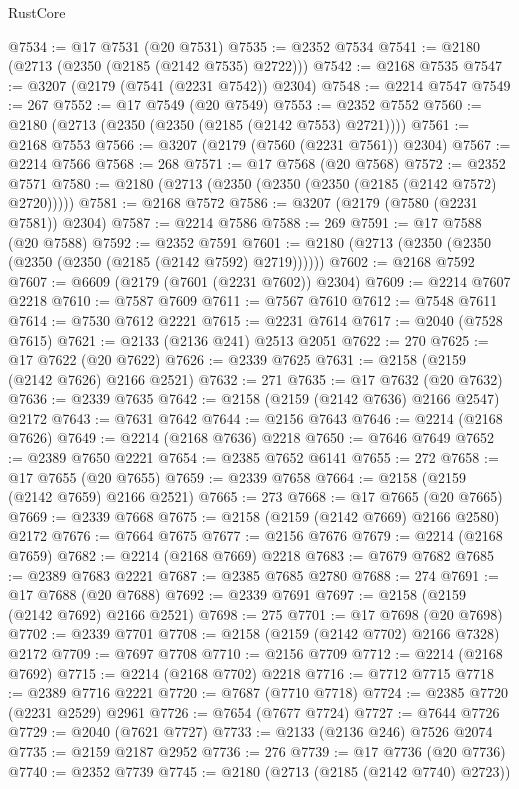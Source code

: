 \begin{lexlean}{RustCore}
\begin{coremodule}
@7534 := @17 @7531 (@20 @7531)
@7535 := @2352 @7534
@7541 := @2180 (@2713 (@2350 (@2185 (@2142 @7535) @2722)))
@7542 := @2168 @7535
@7547 := @3207 (@2179 (@7541 (@2231 @7542)) @2304)
@7548 := @2214 @7547
@7549 := 267
@7552 := @17 @7549 (@20 @7549)
@7553 := @2352 @7552
@7560 := @2180 (@2713 (@2350 (@2350 (@2185 (@2142 @7553) @2721))))
@7561 := @2168 @7553
@7566 := @3207 (@2179 (@7560 (@2231 @7561)) @2304)
@7567 := @2214 @7566
@7568 := 268
@7571 := @17 @7568 (@20 @7568)
@7572 := @2352 @7571
@7580 := @2180 (@2713 (@2350 (@2350 (@2350 (@2185 (@2142 @7572) @2720)))))
@7581 := @2168 @7572
@7586 := @3207 (@2179 (@7580 (@2231 @7581)) @2304)
@7587 := @2214 @7586
@7588 := 269
@7591 := @17 @7588 (@20 @7588)
@7592 := @2352 @7591
@7601 := @2180 (@2713 (@2350 (@2350 (@2350 (@2350 (@2185 (@2142 @7592) @2719))))))
@7602 := @2168 @7592
@7607 := @6609 (@2179 (@7601 (@2231 @7602)) @2304)
@7609 := @2214 @7607 @2218
@7610 := @7587 @7609
@7611 := @7567 @7610
@7612 := @7548 @7611
@7614 := @7530 @7612 @2221
@7615 := @2231 @7614
@7617 := @2040 (@7528 @7615)
@7621 := @2133 (@2136 @241) @2513 @2051
@7622 := 270
@7625 := @17 @7622 (@20 @7622)
@7626 := @2339 @7625
@7631 := @2158 (@2159 (@2142 @7626) @2166 @2521)
@7632 := 271
@7635 := @17 @7632 (@20 @7632)
@7636 := @2339 @7635
@7642 := @2158 (@2159 (@2142 @7636) @2166 @2547) @2172
@7643 := @7631 @7642
@7644 := @2156 @7643
@7646 := @2214 (@2168 @7626)
@7649 := @2214 (@2168 @7636) @2218
@7650 := @7646 @7649
@7652 := @2389 @7650 @2221
@7654 := @2385 @7652 @6141
@7655 := 272
@7658 := @17 @7655 (@20 @7655)
@7659 := @2339 @7658
@7664 := @2158 (@2159 (@2142 @7659) @2166 @2521)
@7665 := 273
@7668 := @17 @7665 (@20 @7665)
@7669 := @2339 @7668
@7675 := @2158 (@2159 (@2142 @7669) @2166 @2580) @2172
@7676 := @7664 @7675
@7677 := @2156 @7676
@7679 := @2214 (@2168 @7659)
@7682 := @2214 (@2168 @7669) @2218
@7683 := @7679 @7682
@7685 := @2389 @7683 @2221
@7687 := @2385 @7685 @2780
@7688 := 274
@7691 := @17 @7688 (@20 @7688)
@7692 := @2339 @7691
@7697 := @2158 (@2159 (@2142 @7692) @2166 @2521)
@7698 := 275
@7701 := @17 @7698 (@20 @7698)
@7702 := @2339 @7701
@7708 := @2158 (@2159 (@2142 @7702) @2166 @7328) @2172
@7709 := @7697 @7708
@7710 := @2156 @7709
@7712 := @2214 (@2168 @7692)
@7715 := @2214 (@2168 @7702) @2218
@7716 := @7712 @7715
@7718 := @2389 @7716 @2221
@7720 := @7687 (@7710 @7718)
@7724 := @2385 @7720 (@2231 @2529) @2961
@7726 := @7654 (@7677 @7724)
@7727 := @7644 @7726
@7729 := @2040 (@7621 @7727)
@7733 := @2133 (@2136 @246) @7526 @2074
@7735 := @2159 @2187 @2952
@7736 := 276
@7739 := @17 @7736 (@20 @7736)
@7740 := @2352 @7739
@7745 := @2180 (@2713 (@2185 (@2142 @7740) @2723))

\end{coremodule}
\end{lexlean}
